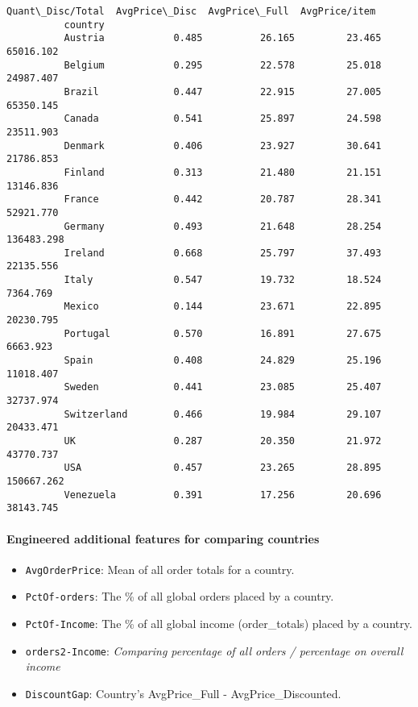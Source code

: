 \documentclass[11pt]{article}
\providecommand{\tightlist}{%
      \setlength{\itemsep}{0pt}\setlength{\parskip}{0pt}}
\begin{document}
\begin{Verbatim}[commandchars=\\\{\}]
                       Quant\_Disc/Total  AvgPrice\_Disc  AvgPrice\_Full  AvgPrice/item  
          country                                                                     
          Austria            0.485          26.165         23.465        65016.102    
          Belgium            0.295          22.578         25.018        24987.407    
          Brazil             0.447          22.915         27.005        65350.145    
          Canada             0.541          25.897         24.598        23511.903    
          Denmark            0.406          23.927         30.641        21786.853    
          Finland            0.313          21.480         21.151        13146.836    
          France             0.442          20.787         28.341        52921.770    
          Germany            0.493          21.648         28.254       136483.298    
          Ireland            0.668          25.797         37.493        22135.556    
          Italy              0.547          19.732         18.524         7364.769    
          Mexico             0.144          23.671         22.895        20230.795    
          Portugal           0.570          16.891         27.675         6663.923    
          Spain              0.408          24.829         25.196        11018.407    
          Sweden             0.441          23.085         25.407        32737.974    
          Switzerland        0.466          19.984         29.107        20433.471    
          UK                 0.287          20.350         21.972        43770.737    
          USA                0.457          23.265         28.895       150667.262    
          Venezuela          0.391          17.256         20.696        38143.745    
\end{Verbatim}
            
    \hypertarget{engineered-additional-features-for-comparing-countries}{%
\paragraph{Engineered additional features for comparing
countries}\label{engineered-additional-features-for-comparing-countries}}

\begin{itemize}
\tightlist
\item
  \texttt{AvgOrderPrice}: Mean of all order totals for a country.
\item
  \texttt{PctOf-orders}: The \% of all global orders placed by a
  country.
\item
  \texttt{PctOf-Income}: The \% of all global income (order\_totals)
  placed by a country.
\item
  \texttt{orders2-Income}: \emph{Comparing percentage of all orders /
  percentage on overall income}
\item
  \texttt{DiscountGap}: Country's AvgPrice\_Full - AvgPrice\_Discounted.
\end{itemize}
\end{document}

